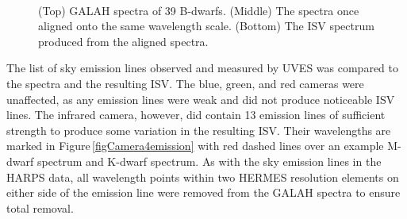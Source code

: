 \begin{figure}
    \\
    \caption{(Top) GALAH spectra of 39 B-dwarfs. (Middle) The spectra once aligned onto the same wavelength scale. (Bottom) The ISV spectrum produced from the aligned spectra.}
    \label{figGALAHbstar2}
\end{figure}

The list of sky emission lines observed and measured by UVES \citep{1992Dekker} was compared to the spectra and the resulting ISV. The blue, green, and red cameras were unaffected, as any emission lines were weak and did not produce noticeable ISV lines. The infrared camera, however, did contain 13 emission lines of sufficient strength to produce some variation in the resulting ISV. Their wavelengths are marked in Figure\,\ref{figCamera4emission} with red dashed lines over an example M-dwarf spectrum and K-dwarf spectrum. As with the sky emission lines in the HARPS data, all wavelength points within two HERMES resolution elements on either side of the emission line were removed from the GALAH spectra to ensure total removal.\\


